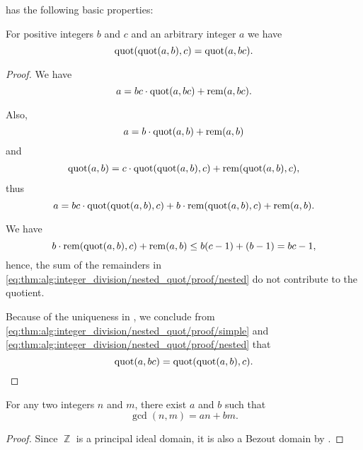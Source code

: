 \begin{proposition}\label{thm:alg:integer_division}
   has the following basic properties:
  \begin{thmenum}
     For positive integers \( b \) and \( c \) and an arbitrary integer \( a \) we have
    \begin{equation}\label{eq:thm:alg:integer_division/nested_quot}
      \operatorname{quot}(\operatorname{quot}(a, b), c) = \operatorname{quot}(a, bc).
    \end{equation}
  \end{thmenum}
\end{proposition}
\begin{proof}
   We have
  \begin{equation}\label{eq:thm:alg:integer_division/nested_quot/proof/simple}
    a = bc \cdot \operatorname{quot}(a, bc) + \operatorname{rem}(a, bc).
  \end{equation}

  Also,
  \begin{equation*}
    a = b \cdot \operatorname{quot}(a, b) + \operatorname{rem}(a, b)
  \end{equation*}
  and
  \begin{align*}
    \operatorname{quot}(a, b) = c \cdot \operatorname{quot}(\operatorname{quot}(a, b), c) + \operatorname{rem}(\operatorname{quot}(a, b), c),
  \end{align*}
  thus
  \begin{equation}\label{eq:thm:alg:integer_division/nested_quot/proof/nested}
    a = bc \cdot \operatorname{quot}(\operatorname{quot}(a, b), c) + b \cdot \operatorname{rem}(\operatorname{quot}(a, b), c) + \operatorname{rem}(a, b).
  \end{equation}

  We have
  \begin{equation*}
    b \cdot \operatorname{rem}(\operatorname{quot}(a, b), c) + \operatorname{rem}(a, b)
    \leq
    b(c - 1) + (b - 1)
    =
    bc - 1,
  \end{equation*}
  hence, the sum of the remainders in \eqref{eq:thm:alg:integer_division/nested_quot/proof/nested} do not contribute to the quotient.

  Because of the uniqueness in , we conclude from \eqref{eq:thm:alg:integer_division/nested_quot/proof/simple} and \eqref{eq:thm:alg:integer_division/nested_quot/proof/nested} that
  \begin{equation*}
    \operatorname{quot}(a, bc) = \operatorname{quot}(\operatorname{quot}(a, b), c).
  \end{equation*}
\end{proof}

\begin{lemma}\label{thm:bezout_lemma}
  For any two integers \( n \) and \( m \), there exist \( a \) and \( b \) such that
  \begin{equation*}
    \gcd(n, m) = an + bm.
  \end{equation*}
\end{lemma}
\begin{proof}
  Since \( \BbbZ \) is a principal ideal domain, it is also a Bezout domain by .
\end{proof}

